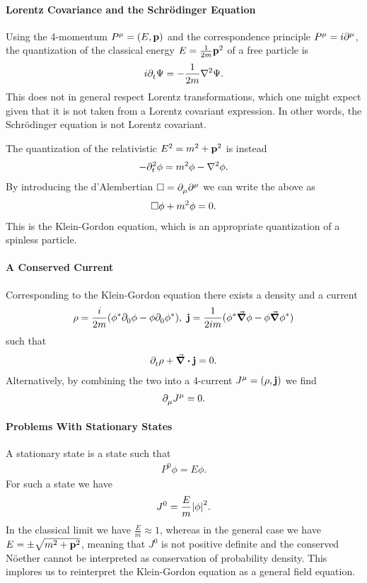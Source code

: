 \paragraph{Lorentz Covariance and the Schrödinger Equation}
Using the 4-momentum $P^{\mu} = (E, \vb{p})$ and the correspondence principle $P^{\mu} = i\partial^{\mu}_{}$, the quantization of the classical energy $E = \frac{1}{2m}\vb{p}^{2}$ of a free particle is
\begin{align*}
	i\del{}{t}{\Psi} = -\frac{1}{2m}\laplacian{\Psi}.
\end{align*}
This does not in general respect Lorentz transformations, which one might expect given that it is not taken from a Lorentz covariant expression. In other words, the Schrödinger equation is not Lorentz covariant.

The quantization of the relativistic $E^{2} = m^{2} + \vb{p}^{2}$ is instead
\begin{align*}
	-\del{2}{t}{\phi} = m^{2}\phi - \laplacian{\phi}.
\end{align*}
By introducing the d'Alembertian $\square  = \partial^{}_{\mu}\partial^{\mu}_{}$ we can write the above as
\begin{align*}
	\square \phi + m^{2}\phi = 0.
\end{align*}
This is the Klein-Gordon equation, which is an appropriate quantization of a spinless particle.

\paragraph{A Conserved Current}
Corresponding to the Klein-Gordon equation there exists a density and a current
\begin{align*}
	\rho = \frac{i}{2m}(\phi^{*}\partial^{}_{0}\phi - \phi\partial^{}_{0}\phi^{*}),\ \vb{j} = \frac{1}{2im}(\phi^{*}\grad{\phi} - \phi\grad{\phi^{*}})
\end{align*}
such that
\begin{align*}
	\partial^{}_{t}\rho + \div{\vb{j}} = 0.
\end{align*}
Alternatively, by combining the two into a 4-current $J^{\mu} = (\rho, \vb{j})$ we find
\begin{align*}
	\partial^{}_{\mu}J^{\mu} = 0.
\end{align*}

\paragraph{Problems With Stationary States}
A stationary state is a state such that
\begin{align*}
	P^{0}\phi = E\phi.
\end{align*}
For such a state we have
\begin{align*}
	J^{0} = \frac{E}{m}\abs{\phi}^{2}.
\end{align*}
In the classical limit we have $\frac{E}{m} \approx 1$, whereas in the general case we have $E = \pm\sqrt{m^{2} + \vb{p}^{2}}$, meaning that $J^{0}$ is not positive definite and the conserved Nöether cannot be interpreted as conservation of probability density. This implores us to reinterpret the Klein-Gordon equation as a general field equation.

